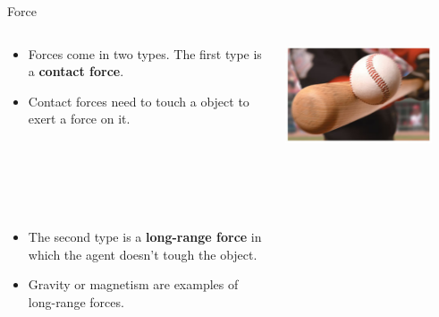 \documentclass{beamer}
\newcommand{\red}[1]{{\color{red}{#1}}}
\begin{document}
\begin{frame}{Force}
\begin{columns}
\begin{column}{0.6\textwidth}
\begin{itemize}
   \item Forces come in two types. The first type is a {\bf contact force}.
   \item Contact forces need to touch a object to exert a force on it.
   \\~\\~\\~\\~\\~\\
   \item The second type is a {\bf long-range force} in which the agent doesn't tough the object. \red{Examples?}
   \item<2> Gravity or magnetism are examples of long-range forces.
\end{itemize}
\end{column}
\begin{column}{0.4\textwidth}
\begin{center}
   \includegraphics[width=0.85\textwidth]{../figures/05_Pg111_UnFigure5.jpg}
   \\~\\

\end{center}
\end{column}
\end{columns}
\end{frame}
\end{document}
